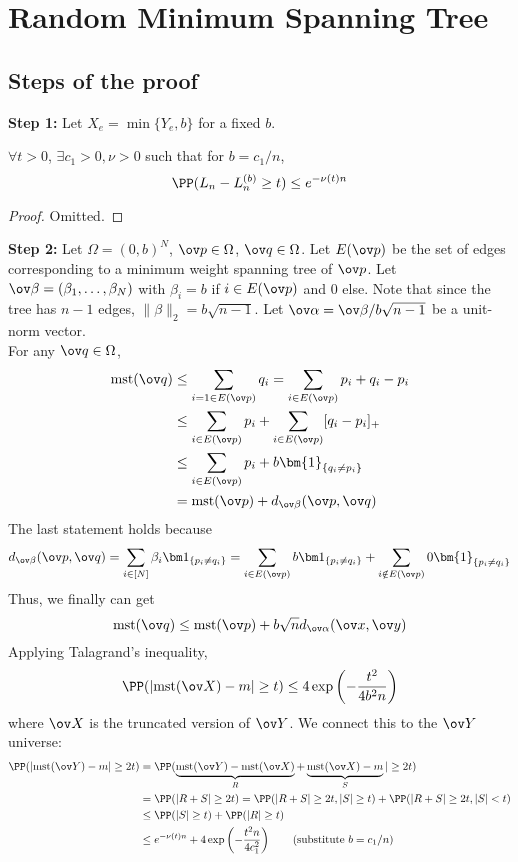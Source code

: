 \chapter{Random Minimum Spanning Tree}
\newcommand{\mst}{\text{mst}}
\section{Steps of the proof}
\textbf{Step 1:} Let $X_e = \min\{Y_e, b\}$ for a fixed $b$.
\begin{prop}
$\forall t > 0$, $\exists c_1 > 0, \nu > 0$ such that for $b = c_1 / n$,
\[
\PP(L_n - L_n^{(b)} \geq t) \leq e^{-\nu(t) n}
\]
\end{prop}
\begin{proof}
Omitted.
\end{proof}
\textbf{Step 2:} Let $\Omega = (0,b)^N$, $\ov p \in \Omega$, $\ov q \in \Omega$. Let $E(\ov p)$ be the set of edges corresponding to a minimum weight spanning tree of $\ov p$. Let $\ov \beta = (\beta_1, \dots, \beta_N)$ with $\beta_i = b$ if $i \in E(\ov p)$ and $0$ else. Note that since the tree has $n-1$ edges, $\|\beta\|_2 = b\sqrt{n-1}$. Let $\ov \alpha = \ov \beta / b\sqrt{n-1}$ be a unit-norm vector. \\
For any $\ov q \in \Omega$, 
\begin{align*}
\mst(\ov q) &\leq \sum_{i=1 \in E(\ov p)} q_i   = \sum_{i \in E(\ov p)} p_i + q_i - p_i \\
&\leq \sum_{i \in E(\ov p)} p_i + \sum_{i \in E(\ov p)} [q_i - p_i]_+ \\
&\leq \sum_{i \in E(\ov p)} p_i + b \bm{1}_{\{q_i \neq p_i\}} \\
&= \mst(\ov p) + d_{\ov \beta}(\ov p, \ov q)
\end{align*}
The last statement holds because
\[
d_{\ov\beta}(\ov p, \ov q) = \sum_{i \in [N]} \beta_i \bm1_{\{p_i \neq q_i\}} = \sum_{i \in E(\ov p)} b \bm 1_{\{p_i \neq q_i\}} + \sum_{i \notin E(\ov p)} 0 \bm {1}_{\{p_i \neq q_i\}} 
\]
Thus, we finally can get
\[
\mst(\ov q) \leq \mst(\ov p) + b \sqrt{n} d_{\ov \alpha}(\ov x, \ov y)
\]
Applying Talagrand's inequality,
\[
\PP(|\mst(\ov X) - m|\geq t) \leq 4\exp\left(-\frac{t^2}{4b^2n}\right)
\]
where $\ov X$ is the truncated version of $\ov Y$. We connect this to the $\ov Y$ universe:
\begin{align*}
\PP(|\mst(\ov Y) - m| \geq 2t) &= \PP(\underbrace{\mst(\ov Y) - \mst(\ov X)}_{R} + \underbrace{\mst(\ov X) - m}_{S}| \geq 2t) \\
&= \PP(|R + S| \geq 2t) = \PP(|R+S| \geq 2t, |S| \geq t) + \PP(|R+S| \geq 2t, |S| < t) \\
&\leq \PP(|S| \geq t) + \PP(|R| \geq t) \\
&\leq e^{-\nu(t) n} + 4\exp\left(-\frac{t^2 n}{4c_1^2}\right) \qquad \text{(substitute $b = c_1/n$)}
\end{align*}
